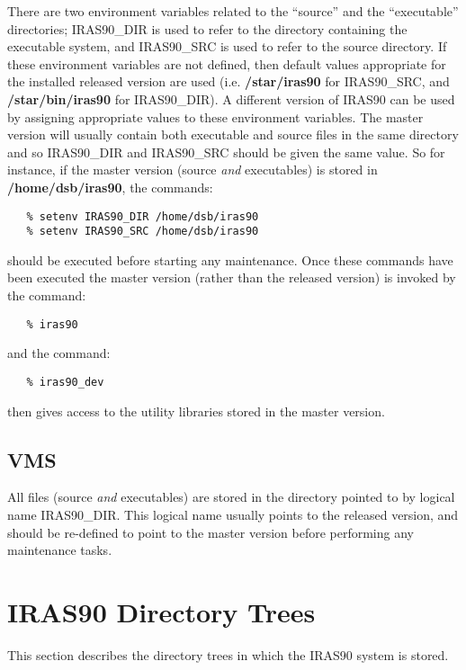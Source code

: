 There are two environment variables related to the ``source'' and the
``executable'' directories; {\small IRAS90\_DIR} is used to refer to the
directory containing the executable system, and {\small IRAS90\_SRC} is used to
refer to the source directory. If these environment variables are not defined,
then default values appropriate for the installed released version are used
(i.e. {\bf /star/iras90} for {\small IRAS90\_SRC}, and {\bf /star/bin/iras90}
for {\small IRAS90\_DIR}). A different version of {\small IRAS90} can be used by
assigning appropriate values to these environment variables. The master version
will usually contain both executable and source files in the same directory
and so {\small IRAS90\_DIR} and {\small IRAS90\_SRC} should be given the same
value. So for instance, if the master version (source {\em and} executables) is
stored in {\bf /home/dsb/iras90}, the commands:

\small
\begin{verbatim}
   % setenv IRAS90_DIR /home/dsb/iras90
   % setenv IRAS90_SRC /home/dsb/iras90
\end{verbatim}
\normalsize

should be executed before starting any maintenance. Once these commands have
been executed the master version (rather than the released version) is invoked
by the command:

\small
\begin{verbatim}
   % iras90
\end{verbatim}
\normalsize

and the command:

\small
\begin{verbatim}
   % iras90_dev
\end{verbatim}
\normalsize

then gives access to the utility libraries stored in the master version.

\subsection{VMS}
All files (source {\em and} executables) are stored in the directory pointed to
by logical name {\small IRAS90\_DIR}. This logical name usually points to the
released version, and should be re-defined to point to the master version before
performing any maintenance tasks.

\section{IRAS90 Directory Trees}
This section describes the directory trees in which the {\small IRAS90} system
is stored.

